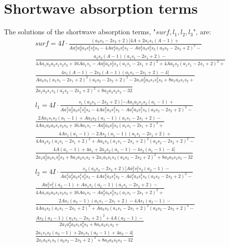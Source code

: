 \documentclass[a4paper,12pt]{article}
\begin{document}
\section{Shortwave absorption terms}\label{sec:short}
The solutions of the shortwave absorption terms, "$surf,l_1, l_2, l_3$", are:
\begin{align*}
    &surf=4I\cdot\frac{(a_3s_3 - 2s_3 + 2)[4A + 2a_1s_1(A - 1) +}{Aa_1^2a_2^2a_3s_1^2s_2^2s_3 - 4Aa_1^2a_2s_1^2s_2 -Aa_1^2a_3s_1^2s_3(a_2s_2 - 2s_2 + 2)^2 - }\\
    &\frac{a_2s_2(A - 1)(a_1s_1 - 2s_1 + 2) -}{4Aa_1a_2a_3s_1s_2s_3 + 16Aa_1s_1 - Aa_2^2a_3s_2^2s_3(a_1s_1 - 2s_1 + 2)^2 + 4Aa_2s_2(a_1s_1 - 2s_1 + 2)^2+}\\
    &\frac{4s_1(A - 1) - 2s_2(A - 1)(a_1s_1 - 2s_1 + 2) - 4]}{Aa_3s_3(a_1s_1 - 2s_1 + 2)^2(a_2s_2 - 2s_2 + 2)^2 - 2a_1a_2^2a_3s_1s_2^2s_3 + 8a_1a_2s_1s_2 +}\\
    &\frac{}{2a_1a_3s_1s_3(a_2s_2 - 2s_2 + 2)^2 + 8a_2a_3s_2s_3 - 32}\\
    &\\
    &l_1=4I\cdot\frac{s_1(a_3s_3 - 2s_3 + 2)[-Aa_1a_2s_1s_2(a_1 - 1) +}{Aa_1^2a_2^2a_3s_1^2s_2^2s_3 - 4Aa_1^2a_2s_1^2s_2 - Aa_1^2a_3s_1^2s_3(a_2s_2 - 2s_2 + 2)^2 -}\\
    &\frac{2Aa_1s_1s_2(a_1 - 1) + Aa_2s_2(a_1 - 1)(a_1s_1 - 2s_1 + 2) - }{4Aa_1a_2a_3s_1s_2s_3 + 16Aa_1s_1 - Aa_2^2a_3s_2^2s_3(a_1s_1 - 2s_1 + 2)^2 +}\\
    &\frac{4As_1(a_1 - 1) - 2As_2(a_1 - 1)(a_1s_1 - 2s_1 + 2) +}{4Aa_2s_2(a_1s_1 - 2s_1 + 2)^2 + Aa_3s_3(a_1s_1 - 2s_1 + 2)^2(a_2s_2 - 2s_2 + 2)^2 -  }\\
    &\frac{4A(a_1 - 1) + 4a_1 + 2a_2s_2(a_1 - 1) - 4s_2(a_1 - 1) - 4]}{2a_1a_2^2a_3s_1s_2^2s_3 +8a_1a_2s_1s_2 + 2a_1a_3s_1s_3(a_2s_2 - 2s_2 + 2)^2 + 8a_2a_3s_2s_3 - 32}\\
    &\\
    &l_2=4I\cdot\frac{s_2(a_3s_3 - 2s_3 + 2)[Aa_1^2s_1^2s_2(a_2 - 1) -}{Aa_1^2a_2^2a_3s_1^2s_2^2s_3 - 4Aa_1^2a_2s_1^2s_2 - Aa_1^2a_3s_1^2s_3(a_2s_2 - 2s_2 + 2)^2 -}\\
    &\frac{Aa_1^2s_1^2(a_2 - 1) + Aa_1s_1(a_2 - 1)(a_1s_1 - 2s_1 + 2) -}{4Aa_1a_2a_3s_1s_2s_3 + 16Aa_1s_1 - Aa_2^2a_3s_2^2s_3(a_1s_1 - 2s_1 + 2)^2 +}\\
    &\frac{2As_1(a_2 - 1)(a_1s_1 - 2s_1 + 2) - 4As_1(a_2 - 1) -}{4Aa_2s_2(a_1s_1 - 2s_1 + 2)^2 + Aa_3s_3(a_1s_1 - 2s_1 + 2)^2(a_2s_2 - 2s_2 + 2)^2 -}\\
    &\frac{As_2(a_2 - 1)(a_1s_1 - 2s_1 + 2)^2 + 4A(a_2 - 1) -}{2a_1a_2^2a_3s_1s_2^2s_3 + 8a_1a_2s_1s_2 +}\\
    &\frac{2a_1s_1s_2(a_2 - 1) + 2a_1s_1(a_2 - 1) + 4a_2 - 4]}{2a_1a_3s_1s_3(a_2s_2 - 2s_2 + 2)^2 + 8a_2a_3s_2s_3 - 32}\\
\end{align*}
\end{document}
